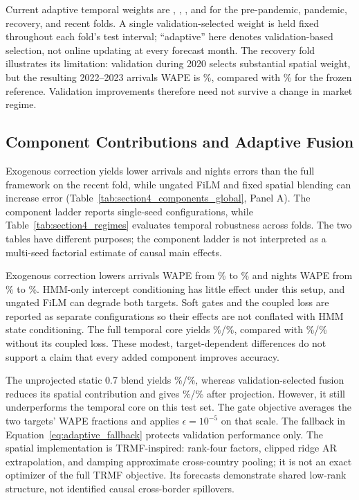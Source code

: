 \documentclass[sigconf]{acmart}
\begin{document}
Current adaptive temporal weights are \ResultWeightTranquil, \ResultWeightShock, \ResultWeightRecovery, and \ResultWeightRecent{} for the pre-pandemic, pandemic, recovery, and recent folds. A single validation-selected weight is held fixed throughout each fold's test interval; ``adaptive'' here denotes validation-based selection, not online updating at every forecast month. The recovery fold illustrates its limitation: validation during 2020 selects substantial spatial weight, but the resulting 2022--2023 arrivals WAPE is \ResultAdaptiveRecoveryArr\%, compared with \ResultFrozenRecoveryArr\% for the frozen reference. Validation improvements therefore need not survive a change in market regime.

\subsection{Component Contributions and Adaptive Fusion}
\label{sec:component_contributions}
Exogenous correction yields lower arrivals and nights errors than the full framework on the recent fold, while ungated FiLM and fixed spatial blending can increase error (Table~\ref{tab:section4_components_global}, Panel A). The component ladder reports single-seed configurations, while Table~\ref{tab:section4_regimes} evaluates temporal robustness across folds. The two tables have different purposes; the component ladder is not interpreted as a multi-seed factorial estimate of causal main effects.



Exogenous correction lowers arrivals WAPE from \ResultFrozenArrWAPE\% to \ResultExoArrWAPE\% and nights WAPE from \ResultFrozenNigWAPE\% to \ResultExoNigWAPE\%. HMM-only intercept conditioning has little effect under this setup, and ungated FiLM can degrade both targets. Soft gates and the coupled loss are reported as separate configurations so their effects are not conflated with HMM state conditioning. The full temporal core yields \ResultCoreArrWAPE\%/\ResultCoreNigWAPE\%, compared with \ResultNoConsArrWAPE\%/\ResultNoConsNigWAPE\% without its coupled loss. These modest, target-dependent differences do not support a claim that every added component improves accuracy.

The unprojected static 0.7 blend yields \ResultStaticArrWAPE\%/\ResultStaticNigWAPE\%, whereas validation-selected fusion reduces its spatial contribution and gives \ResultFullArrWAPE\%/\ResultFullNigWAPE\% after projection. However, it still underperforms the temporal core on this test set. The gate objective averages the two targets' WAPE fractions and applies $\epsilon=10^{-5}$ on that scale. The fallback in Equation~\ref{eq:adaptive_fallback} protects validation performance only. The spatial implementation is TRMF-inspired: rank-four factors, clipped ridge AR extrapolation, and damping approximate cross-country pooling; it is not an exact optimizer of the full TRMF objective. Its forecasts demonstrate shared low-rank structure, not identified causal cross-border spillovers.
\end{document}
